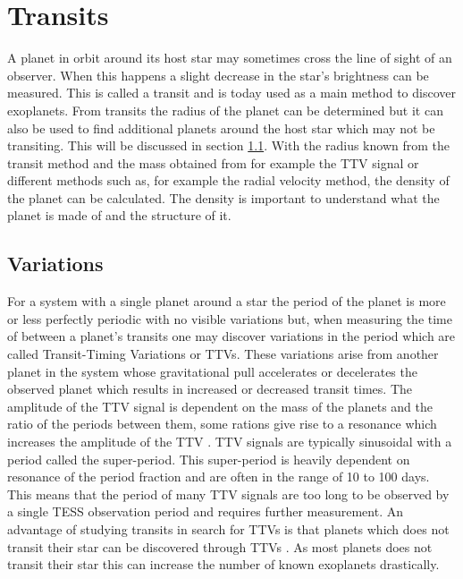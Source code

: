 \documentclass[12pt]{report}
\begin{document}
\section{Transits}
	A planet in orbit around its host star may sometimes cross the line of sight of an observer. When this happens a slight decrease in the star's brightness can be measured. This is called a transit and is today used as a main method to discover exoplanets. From transits the radius of the planet can be determined but it can also be used to find additional planets around the host star which may not be transiting. This will be discussed in section \ref{sec:trans_vari}. With the radius known from the transit method and the mass obtained from for example the TTV signal or different methods such as, for example the radial velocity method, the density of the planet can be calculated. The density is important to understand what the planet is made of and the structure of it.

\subsection{Variations}
\label{sec:trans_vari}

	For a system with a single planet around a star the period of the planet is more or less perfectly periodic with no visible variations but, when measuring the time of between a planet's transits one may discover variations in the period which are called Transit-Timing Variations or TTVs. These variations arise from another planet in the system whose gravitational pull accelerates or decelerates the observed planet which results in increased or decreased transit times. The amplitude of the TTV signal is dependent on the mass of the planets and the ratio of the periods between them, some rations give rise to a resonance which increases the amplitude of the TTV \citep{0004-637X-688-1-636}. TTV signals are typically sinusoidal \citep{2012ApJ...761..122L} with a period called the super-period. This super-period is heavily dependent on resonance of the period fraction and are often in the range of 10 to 100 days. This means that the period of many TTV signals are too long to be observed by a single TESS observation period and requires further measurement. An advantage of studying transits in search for TTVs is that planets which does not transit their star can be discovered through TTVs \citep{0004-637X-777-1-3}. As most planets does not transit their star this can increase the number of known exoplanets drastically.
\end{document}
